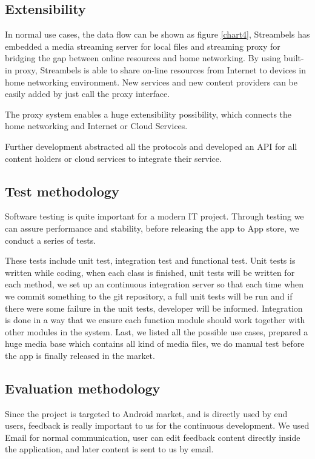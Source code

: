 \subsection{Extensibility}
In normal use cases, the data flow can be shown as figure \ref{chart4},
Streambels has embedded a media streaming server for local files and streaming
proxy for bridging the gap between online resources and home networking. By
using built-in proxy, Streambels is able to share on-line resources from
Internet to devices in home networking environment. New services and new
content providers can be easily added by just call the proxy interface.

The proxy system enables a huge extensibility possibility, which connects the
home networking and Internet or Cloud Services.

Further development abstracted all the protocols and developed an API for all
content holders or cloud services to integrate their service.

\subsection{Test methodology}
Software testing is quite important for a modern IT project. Through testing we
can assure performance and stability, before releasing the app to App store, we
conduct a series of tests.

These tests include unit test, integration test and functional test.
Unit tests is written while coding, when each class is finished, unit tests will
be written for each method, we set up an continuous integration server so that
each time when we commit something to the git repository, a full unit tests will
be run and if there were some failure in the unit tests, developer will be
informed. Integration is done in a way that we ensure each function module
should work together with other modules in the system. Last, we listed all the
possible use cases, prepared a huge media base which contains all kind of media
files, we do manual test before the app is finally released in the market.

\subsection{Evaluation methodology}
Since the project is targeted to Android market, and is directly used by
end users, feedback is really important to us for the continuous development. We
used Email for normal communication, user can edit feedback content directly
inside the application, and later content is sent to us by email.

